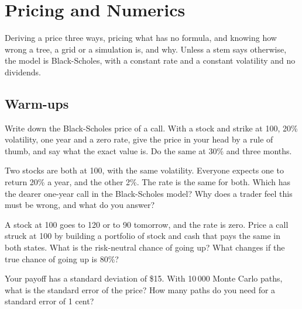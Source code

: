 \chapter{Pricing and Numerics}\label{ch:iv2:pricing-and-numerics}

\begin{ivtrains}
Deriving a price three ways, pricing what has no formula, and knowing how wrong a tree, a grid or a simulation is, and why. Unless a stem says otherwise, the model is Black-Scholes, with a constant rate and a constant volatility and no dividends.
\end{ivtrains}

\section{Warm-ups}

\begin{question}\label{iq:iv2:pricing-and-numerics:1}
Write down the Black-Scholes price of a call. With a stock and strike at 100, 20\% volatility, one year and a zero rate, give the price in your head by a rule of thumb, and say what the exact value is. Do the same at 30\% and three months.
\end{question}

\begin{question}\label{iq:iv2:pricing-and-numerics:2}
Two stocks are both at 100, with the same volatility. Everyone expects one to return 20\% a year, and the other 2\%. The rate is the same for both. Which has the dearer one-year call in the Black-Scholes model? Why does a trader feel this must be wrong, and what do you answer?
\end{question}

\begin{question}\label{iq:iv2:pricing-and-numerics:3}
A stock at 100 goes to 120 or to 90 tomorrow, and the rate is zero. Price a call struck at 100 by building a portfolio of stock and cash that pays the same in both states. What is the risk-neutral chance of going up? What changes if the true chance of going up is 80\%?
\end{question}

\begin{question}\label{iq:iv2:pricing-and-numerics:4}
Your payoff has a standard deviation of \$15. With 10\,000 Monte Carlo paths, what is the standard error of the price? How many paths do you need for a standard error of 1 cent?
\end{question}

